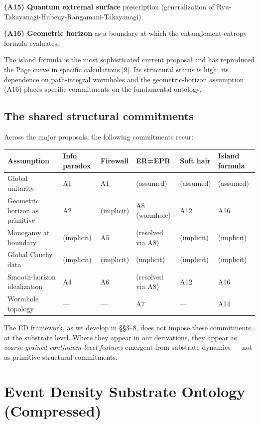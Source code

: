 \documentclass[11pt,a4paper]{article}
\begin{document}
\textbf{(A15) Quantum extremal surface} prescription (generalization of Ryu-Takayanagi-Hubeny-Rangamani-Takayanagi).

\textbf{(A16) Geometric horizon} as a boundary at which the entanglement-entropy formula evaluates.

The island formula is the most sophisticated current proposal and has reproduced the Page curve in specific calculations [9]. Its structural status is high; its dependence on path-integral wormholes and the geometric-horizon assumption (A16) places specific commitments on the fundamental ontology.

\subsection{The shared structural commitments}

Across the major proposals, the following commitments recur:

\begin{center}
\small
\begin{tabular}{@{}p{3.4cm}p{1.8cm}p{1.4cm}p{1.9cm}p{1.6cm}p{1.9cm}@{}}
\toprule
Assumption & Info paradox & Firewall & ER=EPR & Soft hair & Island formula \\
\midrule
Global unitarity & A1 & A1 & (assumed) & (assumed) & (assumed) \\
Geometric horizon as primitive & A2 & (implicit) & A8 (wormhole) & A12 & A16 \\
Monogamy at boundary & (implicit) & A5 & (resolved via A8) & (implicit) & (implicit) \\
Global Cauchy data & (implicit) & (implicit) & (implicit) & (implicit) & (implicit) \\
Smooth-horizon idealization & A4 & A6 & (resolved via A8) & A12 & A16 \\
Wormhole topology & --- & --- & A7 & --- & A14 \\
\bottomrule
\end{tabular}
\end{center}

The ED framework, as we develop in \S\S3--8, does not impose these commitments at the substrate level. Where they appear in our derivations, they appear as \emph{coarse-grained continuum-level features} emergent from substrate dynamics --- not as primitive structural commitments.

\section{Event Density Substrate Ontology (Compressed)}
\end{document}
